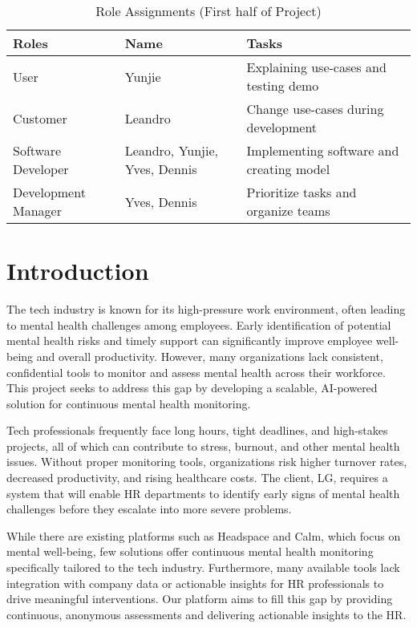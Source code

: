 \documentclass[conference]{IEEEtran}
\begin{document}
\begin{table}[htbp]
    \caption{Role Assignments (First half of Project)}
    \centering
    \begin{tabular}{|p{1.8cm}|p{0.9cm}|p{4.8cm}|}
        \hline
        \textbf{Roles} & \textbf{Name} & \textbf{Tasks} \\ \hline
        User & Yunjie & Explaining use-cases and testing demo \\ \hline
        Customer & Leandro & Change use-cases during development \\ \hline
        Software Developer & Leandro, Yunjie, Yves, Dennis & Implementing software and creating model \\ \hline
        Development Manager & Yves, Dennis & Prioritize tasks and organize teams \\ \hline
    \end{tabular}
    \label{tab:role_assignments}
\end{table}


\section{Introduction}
The tech industry is known for its high-pressure work environment, 
often leading to mental health challenges among employees. 
Early identification of potential mental health risks and timely 
support can significantly improve employee well-being and overall 
productivity. However, many organizations lack consistent, 
confidential tools to monitor and assess mental health across their 
workforce. This project seeks to address this gap by developing a 
scalable, AI-powered solution for continuous mental health monitoring.

Tech professionals frequently face long hours, tight
deadlines, and high-stakes projects, all of which can
contribute to stress, burnout, and other mental health issues.
Without proper monitoring tools, organizations risk higher
turnover rates, decreased productivity, and rising healthcare
costs. The client, LG, requires a system that will enable HR
departments to identify early signs of mental health challenges
before they escalate into more severe problems.\newline

While there are existing platforms such as Headspace and
Calm, which focus on mental well-being, few solutions offer
continuous mental health monitoring specifically tailored to
the tech industry. Furthermore, many available tools lack
integration with company data or actionable insights for HR
professionals to drive meaningful interventions. Our platform
aims to fill this gap by providing continuous, anonymous
assessments and delivering actionable insights to the HR.
\end{document}
